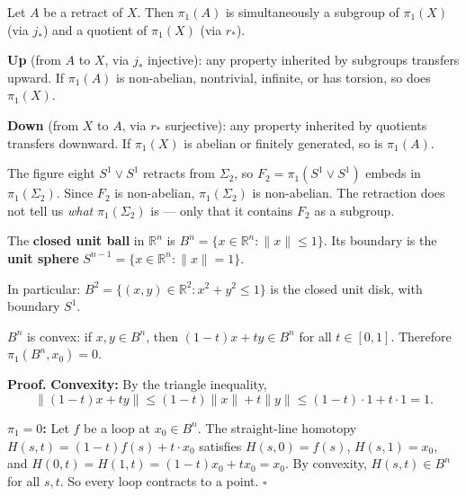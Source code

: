 \documentclass[11pt]{report}
\renewenvironment{proof}[1][Proof]{\noindent\textbf{#1.} }{\hfill$\square$\par\vspace{5pt}}
\begin{document}
\begin{corbox}
Let $A$ be a retract of $X$. Then $\pi_1(A)$ is simultaneously a subgroup of $\pi_1(X)$ (via $j_*$) and a quotient of $\pi_1(X)$ (via $r_*$).

\textbf{Up} (from $A$ to $X$, via $j_*$ injective): any property inherited by subgroups transfers upward. If $\pi_1(A)$ is non-abelian, nontrivial, infinite, or has torsion, so does $\pi_1(X)$.

\textbf{Down} (from $X$ to $A$, via $r_*$ surjective): any property inherited by quotients transfers downward. If $\pi_1(X)$ is abelian or finitely generated, so is $\pi_1(A)$.
\end{corbox}

\begin{exbox}
The figure eight $S^1 \vee S^1$ retracts from $\Sigma_2$, so $F_2 = \pi_1(S^1 \vee S^1)$ embeds in $\pi_1(\Sigma_2)$. Since $F_2$ is non-abelian, $\pi_1(\Sigma_2)$ is non-abelian. The retraction does not tell us \emph{what} $\pi_1(\Sigma_2)$ is --- only that it contains $F_2$ as a subgroup.
\end{exbox}

\begin{defbox}
The \textbf{closed unit ball} in $\mathbb{R}^n$ is $B^n = \{x \in \mathbb{R}^n : \|x\| \leq 1\}$. Its boundary is the \textbf{unit sphere} $S^{n-1} = \{x \in \mathbb{R}^n : \|x\| = 1\}$.

In particular: $B^2 = \{(x,y) \in \mathbb{R}^2 : x^2 + y^2 \leq 1\}$ is the closed unit disk, with boundary $S^1$.
\end{defbox}

\begin{propbox}
$B^n$ is convex: if $x, y \in B^n$, then $(1-t)x + ty \in B^n$ for all $t \in [0,1]$.
Therefore $\pi_1(B^n, x_0) = 0$.
\end{propbox}

\begin{proof}
\textbf{Convexity:} By the triangle inequality,
\[\|(1-t)x + ty\| \leq (1-t)\|x\| + t\|y\| \leq (1-t) \cdot 1 + t \cdot 1 = 1.\]

\textbf{$\pi_1 = 0$:} Let $f$ be a loop at $x_0 \in B^n$. The straight-line homotopy $H(s, t) = (1-t)f(s) + t \cdot x_0$ satisfies $H(s,0) = f(s)$, $H(s,1) = x_0$, and $H(0,t) = H(1,t) = (1-t)x_0 + tx_0 = x_0$. By convexity, $H(s,t) \in B^n$ for all $s, t$. So every loop contracts to a point.
\end{proof}
\end{document}
